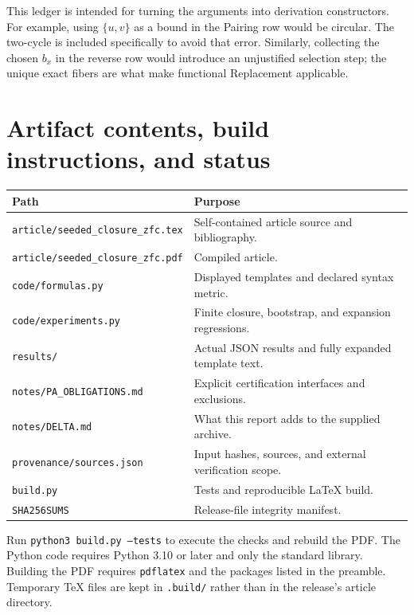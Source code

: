 \documentclass[11pt,letterpaper]{article}
\theoremstyle{definition}\newtheorem{definition}[theorem]{Definition}
\theoremstyle{remark}\newtheorem{remark}[theorem]{Remark}
\begin{document}
This ledger is intended for turning the arguments into derivation
constructors. For example, using $\{u,v\}$ as a bound in the Pairing
row would be circular. The two-cycle is included specifically to avoid
that error. Similarly, collecting the chosen $b_x$ in the reverse row
would introduce an unjustified selection step; the unique exact fibers
are what make functional Replacement applicable.

\section{Artifact contents, build instructions, and status}

\begin{center}
\begin{tabular}{p{.38\linewidth}p{.53\linewidth}}
\toprule
Path & Purpose\\
\midrule
\texttt{article/seeded\_closure\_zfc.tex} & Self-contained article source and bibliography.\\
\texttt{article/seeded\_closure\_zfc.pdf} & Compiled article.\\
\texttt{code/formulas.py} & Displayed templates and declared syntax metric.\\
\texttt{code/experiments.py} & Finite closure, bootstrap, and expansion regressions.\\
\texttt{results/} & Actual JSON results and fully expanded template text.\\
\texttt{notes/PA\_OBLIGATIONS.md} & Explicit certification interfaces and exclusions.\\
\texttt{notes/DELTA.md} & What this report adds to the supplied archive.\\
\texttt{provenance/sources.json} & Input hashes, sources, and external verification scope.\\
\texttt{build.py} & Tests and reproducible LaTeX build.\\
\texttt{SHA256SUMS} & Release-file integrity manifest.\\
\bottomrule
\end{tabular}
\end{center}

Run \texttt{python3 build.py --tests} to execute the checks and rebuild
the PDF. The Python code requires Python 3.10 or later and only the
standard library. Building the PDF requires \texttt{pdflatex} and the
packages listed in the preamble. Temporary TeX files are kept in
\texttt{.build/} rather than in the release's article directory.
\end{document}
